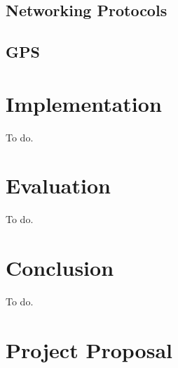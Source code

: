 \section{Networking Protocols}

\section{GPS}


\cleardoublepage
\chapter{Implementation}

To do.

\cleardoublepage
\chapter{Evaluation}

To do.

\cleardoublepage
\chapter{Conclusion}

To do.

\cleardoublepage



\cleardoublepage

\appendix

\chapter{Project Proposal}

%


